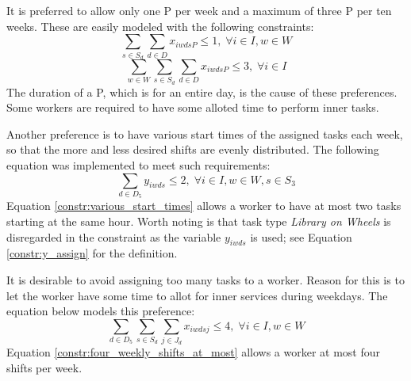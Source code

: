 It is preferred to allow only one P per week and a maximum of three P per ten weeks. These are easily modeled with the following constraints:
\begin{equation} \label{constr:one_PL}
\sum_{s \in S_d}\sum_{d \in D} x_{iwdsP} \leq 1, \; \forall i\in I, w \in W
\end{equation}
\begin{equation} \label{constr:three_PL}
\sum_{w \in W}\sum_{s \in S_d}\sum_{d \in D} x_{iwdsP} \leq 3, \; \forall i\in I
\end{equation}
The duration of a P, which is for an entire day, is the cause of these preferences. Some workers are required to have some alloted time to perform inner tasks.

Another preference is to have various start times of the assigned tasks each week, so that the more and less desired shifts are evenly distributed. The following equation was implemented to meet such requirements:
\begin{equation} \label{constr:various_start_times}
\sum_{d \in D_5} y_{iwds} \leq 2, \; \forall i\in I, w \in W, s \in S_3
\end{equation}
Equation \ref{constr:various_start_times} allows a worker to have at most two tasks starting at the same hour. Worth noting is that task type \textit{Library on Wheels} is disregarded in the constraint as the variable $y_{iwds}$ is used; see Equation \ref{constr:y_assign} for the definition.

It is desirable to avoid assigning too many tasks to a worker. Reason for this is to let the worker have some time to allot for inner services during weekdays. The equation below models this preference:
\begin{equation} \label{constr:four_weekly_shifts_at_most}
\sum_{d \in D_5}\sum_{s \in S_d}\sum_{j \in J_d} x_{iwdsj} \leq 4, \; \forall i\in I, w \in W
\end{equation}
Equation \ref{constr:four_weekly_shifts_at_most} allows a worker at most four shifts per week.

